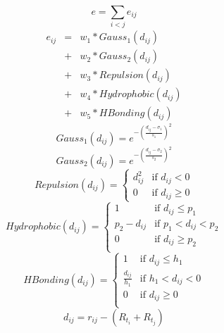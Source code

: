 \documentclass[a4paper,12pt]{article}
\begin{document}
\begin{equation}
\label{eqn:e}
e = \sum_{i < j} e_{ij}
\end{equation}
\begin{eqnarray}
\label{eqn:eij}
e_{ij} &=& w_1 * Gauss_1(d_{ij}) \nonumber \\
       &+& w_2 * Gauss_2(d_{ij}) \nonumber \\
       &+& w_3 * Repulsion(d_{ij}) \nonumber \\
       &+& w_4 * Hydrophobic(d_{ij}) \nonumber \\
       &+& w_5 * HBonding(d_{ij})
\end{eqnarray}
\begin{equation}
\label{eqn:Gauss1}
Gauss_1(d_{ij}) = e^{-(\frac{d_{ij} - \sigma_1}{s_1})^2}
\end{equation}
\begin{equation}
\label{eqn:Gauss2}
Gauss_2(d_{ij}) = e^{-(\frac{d_{ij} - \sigma_2}{s_2})^2}
\end{equation}
\begin{equation}
\label{eqn:Repulsion}
Repulsion(d_{ij}) =
\begin{cases}
d_{ij}^2 & \text{if } d_{ij} < 0\\
0 &\text{if } d_{ij} \geq 0
\end{cases}
\end{equation}
\begin{equation}
\label{eqn:Hydrophobic}
Hydrophobic(d_{ij}) =
\begin{cases}
1 & \text{if } d_{ij} \leq p_1\\
p_2 - d_{ij} & \text{if } p_1 < d_{ij} < p_2\\
0 & \text{if } d_{ij} \geq p_2\\
\end{cases}
\end{equation}
\begin{equation}
\label{eqn:HBonding}
HBonding(d_{ij}) =
\begin{cases}
1 & \text{if } d_{ij} \leq h_1\\
\frac{d_{ij}}{h_1} & \text{if } h_1 < d_{ij} < 0\\
0 & \text{if } d_{ij} \geq 0\\
\end{cases}
\end{equation}
\begin{equation}
\label{eqn:dij}
d_{ij} = r_{ij} - (R_{t_i} + R_{t_j})
\end{equation}
\end{document}
